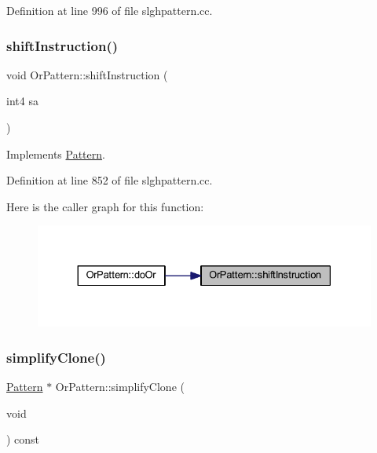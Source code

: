 Definition at line 996 of file slghpattern.\+cc.

\mbox{\label{class_or_pattern_af13615fe47dc6f432201ee4827ff1510}} 
\subsubsection{\texorpdfstring{shiftInstruction()}{shiftInstruction()}}
{\footnotesize\ttfamily void Or\+Pattern\+::shift\+Instruction (\begin{DoxyParamCaption}\item[{int4}]{sa }\end{DoxyParamCaption})\hspace{0.3cm}{\ttfamily [virtual]}}



Implements \mbox{\hyperlink{class_pattern_a8a84c1487128e33cdc27c2069eb4c02a}{Pattern}}.



Definition at line 852 of file slghpattern.\+cc.

Here is the caller graph for this function\+:
\nopagebreak
\begin{figure}[H]
\begin{center}
\leavevmode
\includegraphics[width=330pt]{class_or_pattern_af13615fe47dc6f432201ee4827ff1510_icgraph}
\end{center}
\end{figure}
\mbox{\label{class_or_pattern_ae6db76f35f6dc8661a511c9db40ecfd7}} 
\subsubsection{\texorpdfstring{simplifyClone()}{simplifyClone()}}
{\footnotesize\ttfamily \mbox{\hyperlink{class_pattern}{Pattern}} $\ast$ Or\+Pattern\+::simplify\+Clone (\begin{DoxyParamCaption}\item[{void}]{ }\end{DoxyParamCaption}) const\hspace{0.3cm}{\ttfamily [virtual]}}



